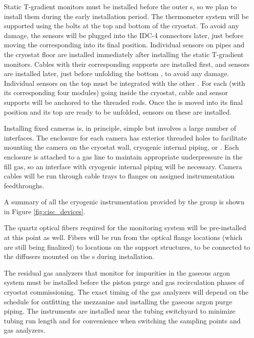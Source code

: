 Static T-gradient monitors must be installed before the outer s, so we plan to install them during the early installation period. The thermometer system will be supported using the bolts at the top and bottom of the cryostat. To avoid any damage, the sensors will be plugged into the IDC-4 connectors later, just before moving the corresponding  into its final position. Individual sensors on pipes and the cryostat floor are installed immediately after installing the static T-gradient monitors. Cables with their corresponding supports are installed first, and sensors are installed later, just before unfolding the bottom , to avoid any damage. Individual sensors on the top  must be integrated with the other . For each  (with its corresponding four  modules) going inside the cryostat, cable and sensor supports will be anchored to the  threaded rods. Once the  is moved into its final position and its top  are ready to be unfolded, sensors on these  are installed.

Installing fixed cameras is, in principle, simple but involves a large number of interfaces. The enclosure for each camera has exterior threaded holes to facilitate mounting the camera on the cryostat wall, cryogenic internal piping, or . Each enclosure is attached to a gas line to maintain appropriate underpressure in the fill gas, so an interface with cryogenic internal piping will be necessary. Camera cables will be run through cable trays to flanges on assigned instrumentation feedthroughs. 

A summary of all the cryogenic instrumentation provided by the  group is shown in Figure \ref{fig:cisc_devices}. 

The quartz optical fibers required for the  monitoring system will be pre-installed at this point as well.  Fibers will be run from the optical flange locations (which are still being finalized) to locations on the  support structures, to be connected to the diffusers mounted on the s during installation.

The residual gas analyzers that monitor for impurities in the gaseous argon system must be installed before the piston purge and gas recirculation phases of cryostat commissioning. The exact timing of the gas analyzers will depend on the schedule for outfitting the mezzanine and installing the gaseous argon purge piping. The instruments are installed near the tubing switchyard to minimize tubing run length and for convenience when switching the sampling points and gas analyzers. 

